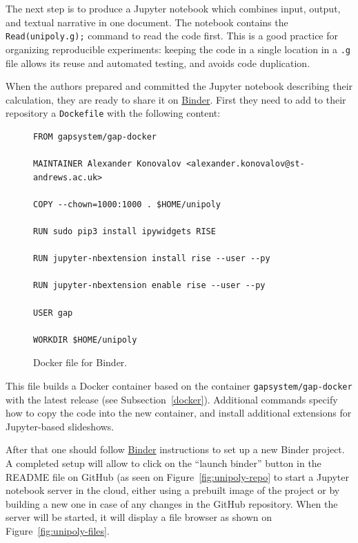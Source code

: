 The next step is to produce a Jupyter notebook which combines input,
output, and textual narrative in one document. The notebook contains
the {\tt Read(unipoly.g);} command to read the code first. This is
a good practice for organizing reproducible experiments: keeping the
code in a single location in a {\tt .g} file allows its reuse and
automated testing, and avoids code duplication. 

When the authors prepared and committed the Jupyter notebook describing
their calculation, they are ready to share it on
\href{https://mybinder.org/}{Binder}. First they need to add 
to their repository a {\tt Dockefile} with the following content:

\begin{figure}[!ht]
\begin{mdframed}
    \centering
    {\Small
\begin{verbatim}
FROM gapsystem/gap-docker

MAINTAINER Alexander Konovalov <alexander.konovalov@st-andrews.ac.uk>

COPY --chown=1000:1000 . $HOME/unipoly

RUN sudo pip3 install ipywidgets RISE

RUN jupyter-nbextension install rise --user --py

RUN jupyter-nbextension enable rise --user --py

USER gap

WORKDIR $HOME/unipoly
\end{verbatim}
    }
\end{mdframed}
    \caption{Docker file for Binder.}
    \label{fig:pkgman-sample}
\end{figure}

This file builds a Docker container based on the container {\tt gapsystem/gap-docker}
with the latest \GAP release
(see Subsection~\ref{docker}). Additional commands specify how to copy the code into
the new container, and install additional extensions for Jupyter-based slideshows.

After that one should follow \href{https://mybinder.org/}{Binder} instructions to
set up a new Binder project. A completed setup will allow to click on the ``launch binder''
button in the README file on GitHub (as seen on Figure~\ref{fig:unipoly-repo}
to start a Jupyter notebook server in the cloud,
either using a prebuilt image of the project or by building a new one in case of any
changes in the GitHub repository. When the server will be started, it will display
a file browser as shown on Figure~\ref{fig:unipoly-files}.

